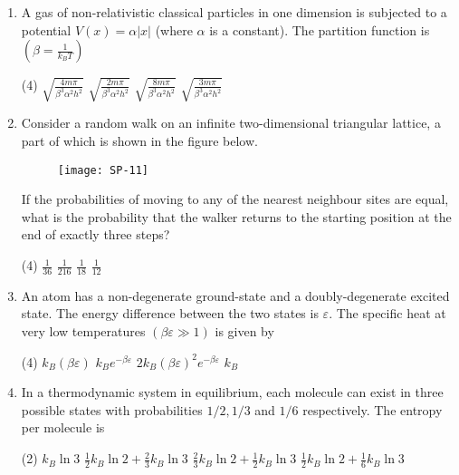\begin{enumerate}
{	}
 \begin{tasks}(4)
	\task[\textbf{a.}]$\frac{16}{25} k_{B}$
	\task[\textbf{b.}] $\frac{8}{25} k_{B} \ln 2$
	\task[\textbf{c.}]$k_{B}(\ln 2)^{2}$
	\task[\textbf{d.}]  $\frac{16}{25} k_{B}(\ln 2)^{2}$
\end{tasks}
\item A gas of non-relativistic classical particles in one dimension is subjected to a potential $V(x)=\alpha|x|$ (where $\alpha$ is a constant). The partition function is $\left(\beta=\frac{1}{k_{B} T}\right)$
{	}
 \begin{tasks}(4)
	\task[\textbf{a.}] $\sqrt{\frac{4 m \pi}{\beta^{3} \alpha^{2} h^{2}}}$
	\task[\textbf{b.}] $\sqrt{\frac{2 m \pi}{\beta^{3} \alpha^{2} h^{2}}}$
	\task[\textbf{c.}]$\sqrt{\frac{8 m \pi}{\beta^{3} \alpha^{2} h^{2}}}$
	\task[\textbf{d.}] $\sqrt{\frac{3 m \pi}{\beta^{3} \alpha^{2} h^{2}}}$
\end{tasks}
\item Consider a random walk on an infinite two-dimensional triangular lattice, a part of which is shown in the figure below.
\begin{figure}[H]
	\centering
	\texttt{[image: SP-11]}
\end{figure}
If the probabilities of moving to any of the nearest neighbour sites are equal, what is the probability that the walker returns to the starting position at the end of exactly three steps?
{	}
 \begin{tasks}(4)
	\task[\textbf{a.}]$\frac{1}{36}$
	\task[\textbf{b.}]$\frac{1}{216}$
	\task[\textbf{c.}] $\frac{1}{18}$
	\task[\textbf{d.}] $\frac{1}{12}$
\end{tasks}
\item 	An atom has a non-degenerate ground-state and a doubly-degenerate excited state. The energy difference between the two states is $\varepsilon$. The specific heat at very low temperatures $(\beta \varepsilon \gg 1)$ is given by
{	}
	 \begin{tasks}(4)
		\task[\textbf{a.}]$k_{B}(\beta \varepsilon)$
		\task[\textbf{b.}]$k_{B} e^{-\beta \varepsilon}$
		\task[\textbf{c.}] $2 k_{B}(\beta \varepsilon)^{2} e^{-\beta \varepsilon}$
		\task[\textbf{d.}]  $k_{B}$
	\end{tasks}
\item In a thermodynamic system in equilibrium, each molecule can exist in three possible states with probabilities $1 / 2,1 / 3$ and $1 / 6$ respectively. The entropy per molecule is
{	}
 \begin{tasks}(2)
	\task[\textbf{a.}] $k_{B} \ln 3$
	\task[\textbf{b.}]$\frac{1}{2} k_{B} \ln 2+\frac{2}{3} k_{B} \ln 3$
	\task[\textbf{c.}]$\frac{2}{3} k_{B} \ln 2+\frac{1}{2} k_{B} \ln 3$
	\task[\textbf{d.}] $\frac{1}{2} k_{B} \ln 2+\frac{1}{6} k_{B} \ln 3$
\end{tasks}
\end{enumerate}
